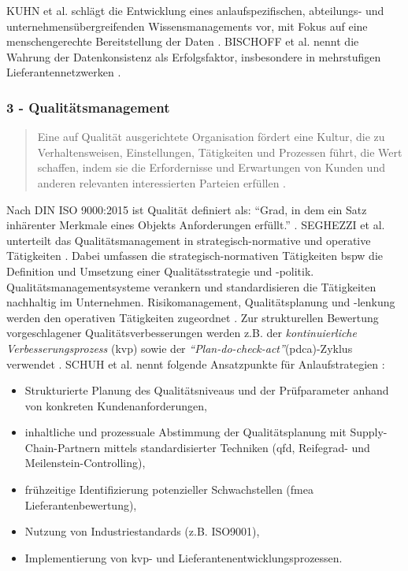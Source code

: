 KUHN et al. schlägt die Entwicklung eines anlaufspezifischen, abteilungs- und unternehmensübergreifenden Wissensmanagements vor, mit Fokus auf eine menschengerechte Bereitstellung der Daten \autocite{Kuhn2002}. 
BISCHOFF et al. nennt die Wahrung der Datenkonsistenz als Erfolgsfaktor, insbesondere in mehrstufigen Lieferantennetzwerken \autocite{Bischoff2007}. 

\subsubsection*{3 - Qualitätsmanagement}
\begin{quotation}
 Eine auf Qualität ausgerichtete Organisation fördert eine Kultur, die zu Verhaltensweisen, Einstellungen, Tätigkeiten und Prozessen führt, die Wert schaffen, indem sie die Erfordernisse und Erwartungen von Kunden und anderen relevanten interessierten Parteien erfüllen \autocite[10]{ISO9000}. %
\end{quotation}

Nach DIN ISO 9000:2015 ist Qualität definiert als: ``Grad, in dem ein Satz inhärenter Merkmale eines Objekts Anforderungen erfüllt.'' \autocite[39]{ISO9000}. %
SEGHEZZI et al. unterteilt das Qualitätsmanagement in strategisch-normative und operative Tätigkeiten \autocite{Seghezzi2013}. 
Dabei umfassen die strategisch-normativen Tätigkeiten \gls{bspw} die Definition und Umsetzung einer Qualitätsstrategie und -politik. Qualitätsmanagementsysteme verankern und standardisieren die Tätigkeiten nachhaltig im Unternehmen. 
Risikomanagement, Qualitätsplanung und -lenkung werden den operativen Tätigkeiten zugeordnet \autocite{Seghezzi2013}. 
Zur strukturellen Bewertung vorgeschlagener Qualitätsverbesserungen werden z.B. der \textit{kontinuierliche Verbesserungsprozess} (\gls{kvp}) sowie der \textit{``Plan-do-check-act''}(\gls{pdca})-Zyklus verwendet \autocite[17]{Schuh2008}.
% 
SCHUH et al. nennt folgende Ansatzpunkte für Anlaufstrategien \autocite[17]{Schuh2008}: 
\begin{itemize}
 \item Strukturierte Planung des Qualitätsniveaus und der Prüfparameter anhand von konkreten Kundenanforderungen,
 \item inhaltliche und prozessuale Abstimmung der Qualitätsplanung mit Supply-Chain-Partnern mittels standardisierter Techniken (\gls{qfd}, Reifegrad- und Meilenstein-Controlling),
 \item frühzeitige Identifizierung potenzieller Schwachstellen (\gls{fmea} Lieferantenbewertung),
 \item Nutzung von Industriestandards (z.B. ISO9001),
 \item Implementierung von \gls{kvp}- und Lieferantenentwicklungsprozessen.
\end{itemize}

